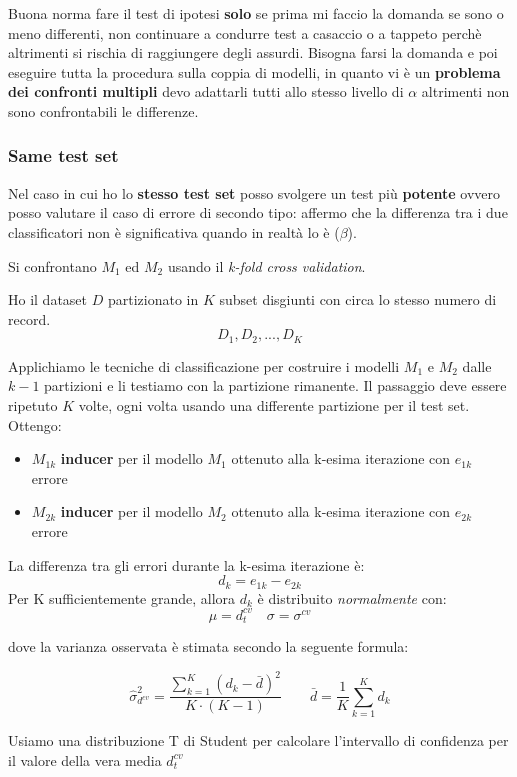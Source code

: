 Buona norma fare il test di ipotesi \textbf{solo} se prima mi faccio la domanda se sono o meno differenti, non continuare a condurre test a casaccio o a tappeto perch\`e altrimenti si rischia di raggiungere degli assurdi. Bisogna farsi la domanda e poi eseguire tutta la procedura sulla coppia di modelli, in quanto vi \`e un \textbf{problema dei confronti multipli} devo adattarli tutti allo stesso livello di $\alpha$ altrimenti non sono confrontabili le differenze. \\

\subsubsection{Same test set}
Nel caso in cui ho lo \textbf{stesso test set} posso svolgere un test pi\`u \textbf{potente} ovvero posso valutare il caso di errore di secondo tipo: affermo che la differenza tra i due classificatori non \`e significativa quando in realt\`a lo \`e ($\beta$). 

Si confrontano $M_1$ ed $M_2$ usando il \textit{k-fold cross validation}.

Ho il dataset $D$ partizionato in $K$ subset disgiunti con circa lo stesso numero di record. 
\[D_1, D_2, ..., D_K\]

Applichiamo le tecniche di classificazione per costruire i modelli $M_1$ e $M_2$ dalle $k-1$ partizioni e li testiamo con la partizione rimanente. Il passaggio deve essere ripetuto $K$ volte, ogni volta usando una differente partizione per il test set. Ottengo:
\begin{itemize}
	\item $M_{1k}$ \textbf{inducer} per il modello $M_1$ ottenuto alla k-esima iterazione con $e_{1k}$ errore
	\item $M_{2k}$ \textbf{inducer} per il modello $M_2$ ottenuto alla k-esima iterazione con $e_{2k}$ errore
\end{itemize}

La differenza tra gli errori durante la k-esima iterazione è:
\[d_k = e_{1k} - e_{2k}\]
Per K sufficientemente grande, allora $d_k$ \`e distribuito \textit{normalmente} con: 
\[\mu = d_t^{cv} \quad \sigma = \sigma^{cv}\]

dove la varianza osservata \`e stimata secondo la seguente formula: 

\[ \hat{\sigma}^2_{d^{cv}} = \frac{\sum_{k=1}^{K}(d_k - \bar{d})^2}{K \cdot (K-1)} \qquad \bar{d} = \frac{1}{K} \sum_{k=1}^K d_k \]

Usiamo una distribuzione T di Student per calcolare l'intervallo di confidenza per il valore della vera media $d_t^{cv}$

